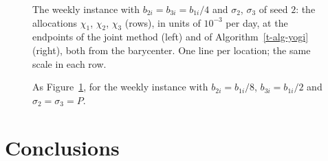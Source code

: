 \documentclass[11pt]{article}
\theoremstyle{plain}
\theoremstyle{remark}
\numberwithin{equation}{section}
\begin{document}
\begin{figure}[ht]
\centering
{}
\caption{The weekly instance with $b_{2i}=b_{3i}=b_{1i}/4$ and $\sigma_2$,
$\sigma_3$ of seed $2$: the allocations $\chi_1$, $\chi_2$, $\chi_3$ (rows),
in units of $10^{-3}$ per day, at the endpoints of the joint method (left) and
of Algorithm~\ref{t-alg-yogi} (right), both from the barycenter. One line per
location; the same scale in each row.}\label{t-fig-alloc-s2}
\end{figure}

\begin{figure}[ht]
\centering
{}
\caption{As Figure~\ref{t-fig-alloc-s2}, for the weekly instance with
$b_{2i}=b_{1i}/8$, $b_{3i}=b_{1i}/2$ and $\sigma_2=\sigma_3=P$.}\label{t-fig-alloc-p}
\end{figure}

\section{Conclusions}\label{t-conclusions}
\end{document}
